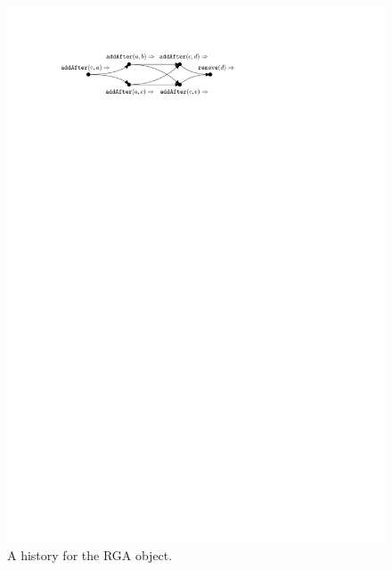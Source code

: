 
\begin{figure}
  \vspace{-3mm}
  \includegraphics[scale=.7]{figures/history-RGA}
  \caption{A history for the RGA object.}
    \vspace{-3mm}
  \label{fig:rga-history}
\end{figure}

